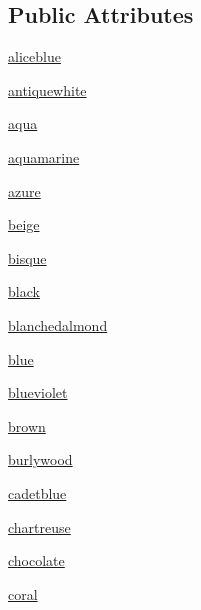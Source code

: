 \subsection*{Public Attributes}
\begin{DoxyCompactItemize}
\item 
\hyperlink{enumbridges_1_1base_1_1_named_color_a8d2d3904e6e7f1f6a144365d6fae6b92}{aliceblue}
\item 
\hyperlink{enumbridges_1_1base_1_1_named_color_a49d6e6cad9f1f9c88e2c59eafa78c45c}{antiquewhite}
\item 
\hyperlink{enumbridges_1_1base_1_1_named_color_afe730da1bd9445649a3bb994d3ae6363}{aqua}
\item 
\hyperlink{enumbridges_1_1base_1_1_named_color_a03e600a15631eec7a17cc26ab5a43c04}{aquamarine}
\item 
\hyperlink{enumbridges_1_1base_1_1_named_color_af0ae4fa86b6735a98706ad6c9e898062}{azure}
\item 
\hyperlink{enumbridges_1_1base_1_1_named_color_ad9479f9ff118db34498fe7533a75c416}{beige}
\item 
\hyperlink{enumbridges_1_1base_1_1_named_color_a7cc4c88e0b4f87d4dbfb577cb533c85e}{bisque}
\item 
\hyperlink{enumbridges_1_1base_1_1_named_color_a504b5b12927b738c0f059332e3dc86a4}{black}
\item 
\hyperlink{enumbridges_1_1base_1_1_named_color_a5abdb4bb3f12aa90c0428389f44acaff}{blanchedalmond}
\item 
\hyperlink{enumbridges_1_1base_1_1_named_color_acb31421a17c79934017ff12619686585}{blue}
\item 
\hyperlink{enumbridges_1_1base_1_1_named_color_a4537ee0ae0ccfd3f35acbacbf9dc6ac0}{blueviolet}
\item 
\hyperlink{enumbridges_1_1base_1_1_named_color_a0d2ef5626f9eb4b338eb6b8bb48feaff}{brown}
\item 
\hyperlink{enumbridges_1_1base_1_1_named_color_a8a958193b6e8c98e57771530ac03c07c}{burlywood}
\item 
\hyperlink{enumbridges_1_1base_1_1_named_color_a90675a32f4ac50199c689fd57d971f24}{cadetblue}
\item 
\hyperlink{enumbridges_1_1base_1_1_named_color_a8fd106d773ffb0338f5793421078b117}{chartreuse}
\item 
\hyperlink{enumbridges_1_1base_1_1_named_color_aee60d632523ad71da082647dd8cb5a37}{chocolate}
\item 
\hyperlink{enumbridges_1_1base_1_1_named_color_a3b6a16749bb83786e03b45eaab6f3e12}{coral}

\end{DoxyCompactItemize}
